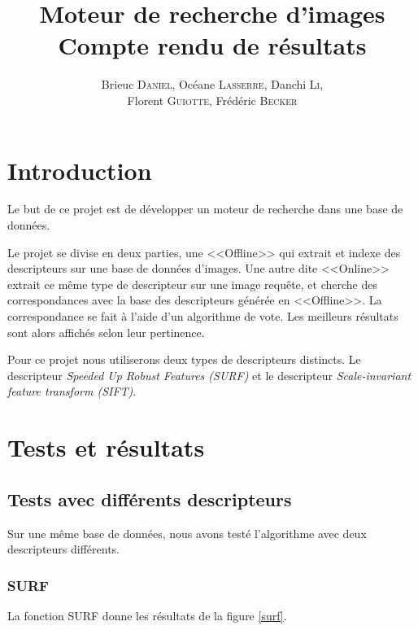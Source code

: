 \documentclass{article}
\author{Brieuc \textsc{Daniel}, Océane \textsc{Lasserre}, Danchi \textsc{Li}, \\ Florent \textsc{Guiotte}, Frédéric \textsc{Becker}}
\title{Moteur de recherche d'images \\ \Large{Compte rendu de résultats}}
\begin{document}
\maketitle
\tableofcontents

\section{Introduction}

Le but de ce projet est de développer un moteur de recherche dans une base de données. 

Le projet se divise en deux parties, une <<Offline>> qui extrait et indexe des descripteurs sur une base de données
d'images. Une autre dite <<Online>> extrait ce même type de descripteur sur une image requête, et cherche des
correspondances avec la base des descripteurs générée en <<Offline>>. La correspondance se fait à l'aide d'un 
algorithme de vote. Les meilleurs résultats sont alors affichés selon leur pertinence. 

Pour ce projet nous utiliserons deux types de descripteurs distincts.
Le descripteur {\em Speeded Up Robust
Features (SURF)} et le descripteur {\em Scale-invariant feature transform (SIFT)}.

\section{Tests et résultats}
\subsection{Tests avec différents descripteurs}

Sur une même base de données, nous avons testé l'algorithme avec deux descripteurs différents.

\subsubsection{SURF}

La fonction SURF donne les résultats de la figure \ref{surf}.
\end{document}
